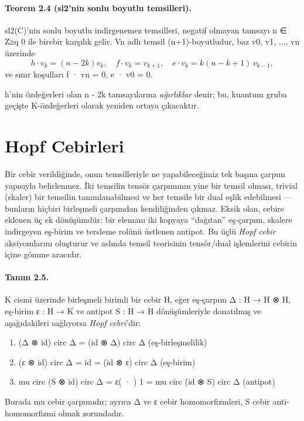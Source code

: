 \documentclass[12pt,a4paper]{report}
\numberwithin{equation}{chapter}
\theoremstyle{plain}
\theoremstyle{definition}
\begin{document}
\paragraph{Teorem 2.4 (sl2'nin sonlu boyutlu temsilleri).}
sl2(C)'nin sonlu boyutlu indirgenemez temsilleri, negatif olmayan
tamsayı n ∈ Z≥q 0 ile birebir karşılık gelir. Vn adlı temsil
(n+1)-boyutludur, baz v0, v1, ..., vn üzerinde
\[
  h \cdot v_k = (n - 2k) v_k, \quad
  f \cdot v_k = v_{k+1}, \quad
  e \cdot v_k = k(n-k+1)\, v_{k-1},
\]
ve sınır koşulları f · vn = 0, e · v0 = 0.


h'nin özdeğerleri olan n - 2k tamsayılarına \emph{ağırlıklar} denir;
bu, kuantum gruba geçişte K-özdeğerleri olarak yeniden ortaya çıkacaktır.

\section{Hopf Cebirleri}

Bir cebir verildiğinde, onun temsilleriyle ne yapabileceğimiz tek başına çarpım
yapısıyla belirlenmez. İki temsilin tensör çarpımının yine bir temsil olması,
trivial (skaler) bir temsilin tanımlanabilmesi ve her temsile bir dual
eşlik edebilmesi --- bunların hiçbiri birleşmeli çarpımdan kendiliğinden çıkmaz.
Eksik olan, cebire eklenen üç ek dönüşümdür: bir elemanı iki kopyaya ``dağıtan''
eş-çarpım, skalere indirgeyen eş-birim ve tersleme rolünü üstlenen antipot. Bu
üçlü \emph{Hopf cebir} aksiyomlarını oluşturur ve aslında temsil teorisinin
tensör/dual işlemlerini cebirin içine gömme aracıdır.

\paragraph{Tanım 2.5.}
K cismi üzerinde birleşmeli birimli bir cebir H, eğer eş-çarpım
Δ : H → H ⊗ H, eş-birim ε : H → K ve antipot
S : H → H dönüşümleriyle donatılmış ve aşağıdakileri sağlıyorsa
\emph{Hopf cebri}'dir:
\begin{enumerate}[leftmargin=*]
  \item (Δ ⊗ id) circ Δ = (id ⊗ Δ) circ Δ \quad (eş-birleşmelilik)
  \item (ε ⊗ id) circ Δ = id = (id ⊗ ε) circ Δ \quad (eş-birim)
  \item mu circ (S ⊗ id) circ Δ = ε( · ) 1 = mu circ (id ⊗ S) circ Δ \quad (antipot)
\end{enumerate}
Burada mu cebir çarpımıdır; ayrıca Δ ve ε cebir homomorfizmleri,
S cebir anti-homomorfizmi olmak zorundadır.
\end{document}
